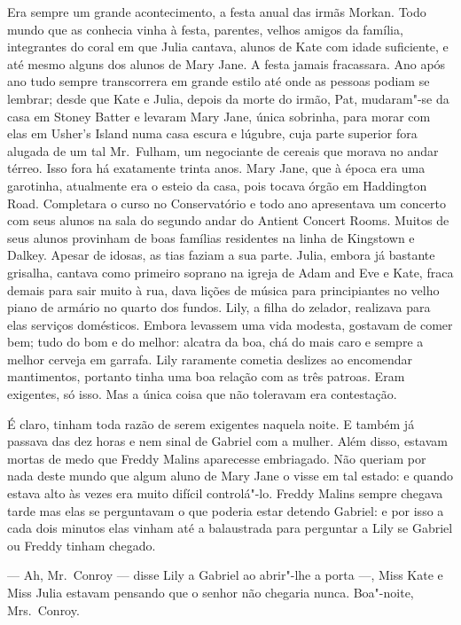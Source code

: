 Era sempre um grande acontecimento, a festa anual das irmãs Morkan.  Todo mundo
que as conhecia vinha à festa, parentes, velhos amigos da família, integrantes
do coral em que Julia cantava, alunos de Kate com idade suficiente, e até mesmo
alguns dos alunos de Mary Jane.  A festa jamais fracassara.  Ano após ano tudo
sempre transcorrera em grande estilo até onde as pessoas podiam se lembrar;
desde que Kate e Julia, depois da morte do irmão, Pat, mudaram"-se da casa em
Stoney Batter e levaram Mary Jane, única sobrinha, para morar com elas em
Usher’s Island numa casa escura e lúgubre, cuja parte superior fora alugada de
um tal Mr.~Fulham, um negociante de cereais que morava no andar térreo.  Isso
fora há exatamente trinta anos.  Mary Jane, que à época era uma garotinha,
atualmente era o esteio da casa, pois tocava órgão em Haddington Road.
Completara o curso no Conservatório e todo ano apresentava um concerto com seus
alunos na sala do segundo andar do Antient Concert Rooms.  Muitos de seus
alunos provinham de boas famílias residentes na linha de Kingstown e Dalkey.
Apesar de idosas, as tias faziam a sua parte.  Julia, embora já bastante
grisalha, cantava como primeiro soprano na igreja de Adam and Eve e Kate, fraca
demais para sair muito à rua, dava lições de música para principiantes no velho
piano de armário no quarto dos fundos.  Lily, a filha do zelador, realizava
para elas serviços domésticos.  Embora levassem uma vida modesta, gostavam de
comer bem; tudo do bom e do melhor: alcatra da boa, chá do mais caro e sempre a
melhor cerveja em garrafa.  Lily raramente cometia deslizes ao encomendar
mantimentos, portanto tinha uma boa relação com as três patroas.  Eram
exigentes, só isso.  Mas a única coisa que não toleravam era contestação.

É claro, tinham toda razão de serem exigentes naquela noite.  E também já
passava das dez horas e nem sinal de Gabriel com a mulher.  Além disso, estavam
mortas de medo que Freddy Malins aparecesse embriagado.  Não queriam por nada
deste mundo que algum aluno de Mary Jane o visse em tal estado: e quando estava
alto às vezes era muito difícil controlá"-lo.  Freddy Malins sempre chegava
tarde mas elas se perguntavam o que poderia estar detendo Gabriel: e por isso a
cada dois minutos elas vinham até a balaustrada para perguntar a Lily se
Gabriel ou Freddy tinham chegado.

--- Ah, Mr.~Conroy --- disse Lily a Gabriel ao abrir"-lhe a porta ---, Miss Kate
e Miss Julia estavam pensando que o senhor não chegaria nunca.  Boa"-noite, Mrs.~Conroy.

